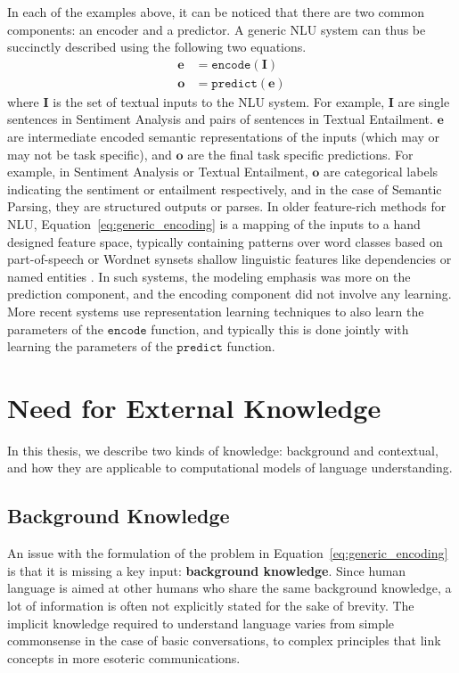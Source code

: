 In each of the examples above, it can be noticed that there are two common components: an encoder and a predictor. A generic NLU system can thus be succinctly described using the
following two equations.
\begin{align}
 \mathbf{e} &= \mathtt{encode}(\mathbf{I}) \label{eq:generic_encoding}\\
 \mathbf{o} &= \mathtt{predict}(\mathbf{e}) \label{eq:generic_prediction}
\end{align}
where $\mathbf{I}$ is the set of textual inputs to the NLU system. 
For example, $\mathbf{I}$  are single sentences in Sentiment Analysis and pairs of sentences in Textual Entailment. $\textbf{e}$ are intermediate 
encoded semantic representations of the inputs (which may or may not be task specific), and $\mathbf{o}$ are the final task specific predictions. For example, in Sentiment Analysis or Textual Entailment, 
$\mathbf{o}$ are categorical labels indicating the sentiment or entailment respectively, and in the case of Semantic Parsing, they are structured outputs or parses. In older feature-rich methods for NLU, 
Equation~\ref{eq:generic_encoding} is a mapping of the inputs to a hand designed feature space, typically containing patterns over word classes based on part-of-speech \cite{corley2005measuring} or Wordnet synsets \cite{moldovan2001logic} 
shallow linguistic features like dependencies \cite{bos2005recognising} or named entities \cite{tatu2005semantic}. In such systems,
the modeling emphasis was more on the prediction component, and the encoding component did not involve any learning. More recent systems \cite{weston2014memory,hermann2015teaching,Sukhbaatar2015EndToEndMN,Xiong2016DynamicMN} 
use representation learning techniques to also learn the parameters of the
$\mathtt{encode}$ function, and typically this is done jointly with learning the parameters of the $\mathtt{predict}$ function.

\section{Need for External Knowledge}
\label{sec:intro_external_knowledge}
In this thesis, we describe two kinds of knowledge: background and contextual, and how they are applicable to computational models of language
understanding.
\subsection{Background Knowledge}
An issue with the formulation of the problem in Equation~\ref{eq:generic_encoding} is that it is missing a key input: \textbf{background knowledge}. 
Since human language is aimed at other humans who share 
the same background knowledge, a lot of information is often not explicitly stated
for the sake of brevity. The implicit knowledge required to understand language varies 
from simple commonsense in the case of basic conversations, to complex principles that link 
concepts in more esoteric communications.

